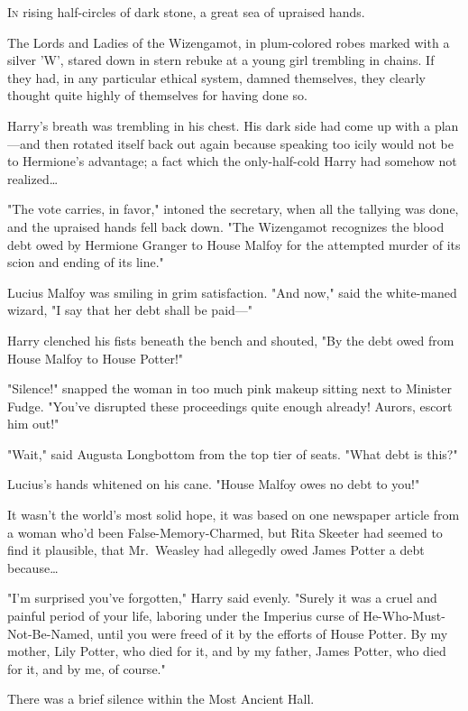 
\lettrine{I}{n} rising 
half-circles of dark stone, a great sea of upraised hands.

The Lords and Ladies of the Wizengamot, in plum-colored robes marked with a 
silver 'W', stared down in stern rebuke at a young girl trembling in chains. If 
they had, in any particular ethical system, damned themselves, they clearly 
thought quite highly of themselves for having done so.

Harry's breath was trembling in his chest. His dark side had come up with a 
plan---and then rotated itself back out again because speaking too icily would 
not be to Hermione's advantage; a fact which the only-half-cold Harry had 
somehow not realized{\ldots}

"The vote carries, in favor," intoned the secretary, when all the tallying was 
done, and the upraised hands fell back down. "The Wizengamot recognizes the 
blood debt owed by Hermione Granger to House Malfoy for the attempted murder of 
its scion and ending of its line."

Lucius Malfoy was smiling in grim satisfaction. "And now," said the white-maned 
wizard, "I say that her debt shall be paid---"

Harry clenched his fists beneath the bench and shouted, "By the debt owed from 
House Malfoy to House Potter!"

"Silence!" snapped the woman in too much pink makeup sitting next to Minister 
Fudge. "You've disrupted these proceedings quite enough already! Aurors, escort 
him out!"

"Wait," said Augusta Longbottom from the top tier of seats. "What debt is this?"

Lucius's hands whitened on his cane. "House Malfoy owes no debt to you!"

It wasn't the world's most solid hope, it was based on one newspaper article 
from a woman who'd been False-Memory-Charmed, but Rita Skeeter had seemed to 
find it plausible, that Mr.~Weasley had allegedly owed James Potter a debt 
because{\ldots}

"I'm surprised you've forgotten," Harry said evenly. "Surely it was a cruel and 
painful period of your life, laboring under the Imperius curse of 
He-Who-Must-Not-Be-Named, until you were freed of it by the efforts of House 
Potter. By my mother, Lily Potter, who died for it, and by my father, James 
Potter, who died for it, and by me, of course."

There was a brief silence within the Most Ancient Hall.

